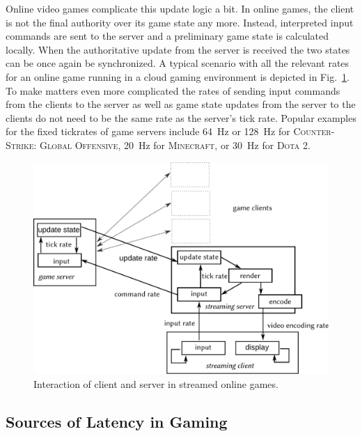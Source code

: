 Online video games complicate this update logic a bit. In online games, 
the client is not the final authority over its game state any more. 
Instead, interpreted input commands are sent to the server and a 
preliminary game state is calculated locally. When the authoritative 
update from the server is received the two states can be once again be 
synchronized. A typical scenario with all the relevant rates for an 
online game running in a cloud gaming environment is depicted in 
Fig.~\ref{fig:tickrate-streamed}. To make matters even more complicated 
the rates of sending input commands from the clients to the server as 
well as game state updates from the server to the clients do not need 
to be the same rate as the server's tick rate. Popular examples for the 
fixed tickrates of game servers include \SI{64}{\hertz} or 
\SI{128}{\hertz} for \textsc{Counter-Strike: Global Offensive}, 
\SI{20}{\hertz} for \textsc{Minecraft}, or \SI{30}{\hertz} for 
\textsc{Dota 2}.

\begin{figure}[!t]
	\centering
	\includegraphics[width=1.0\columnwidth]{images/game-tick-rate-streamed.pdf}
	\caption{Interaction of client and server in streamed online games.}
\label{fig:tickrate-streamed}
\end{figure}


\subsection{Sources of Latency in Gaming}
\label{sec:latency}

